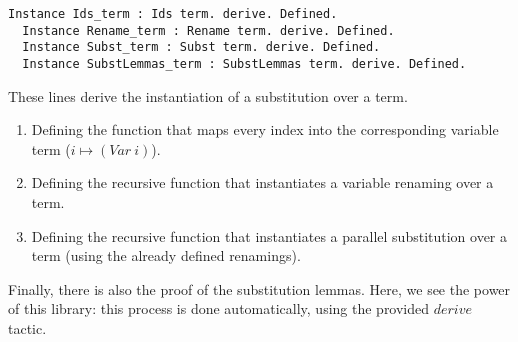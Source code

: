 \begin{lstlisting}[language=Coq]
  Instance Ids_term : Ids term. derive. Defined.
  Instance Rename_term : Rename term. derive. Defined.
  Instance Subst_term : Subst term. derive. Defined.
  Instance SubstLemmas_term : SubstLemmas term. derive. Defined.
\end{lstlisting}

These lines derive the instantiation of a substitution over a term.
\begin{enumerate}
\item Defining the function that maps every index into the corresponding variable term ($i \mapsto (Var \ i)$).
\item Defining the recursive function that instantiates a variable renaming over a term.
\item Defining the recursive function that instantiates a parallel substitution over a term (using the already defined renamings).
\end{enumerate}

Finally, there is also the proof of the substitution lemmas. 
Here, we see the power of this library: this process is done automatically, using the provided $derive$ tactic.

